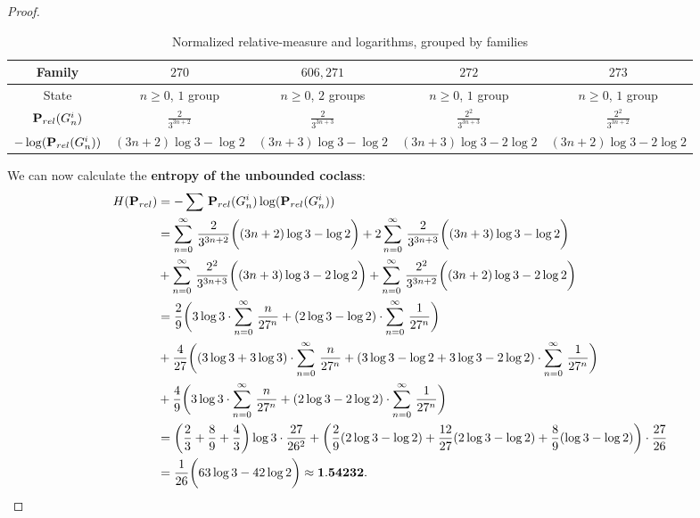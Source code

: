 \documentclass{amsart}
\theoremstyle{definition}
\theoremstyle{remark}
\begin{document}
\begin{proof}
\begin{table}[ht]
\caption{Normalized relative-measure and logarithms, grouped by families}
\label{tbl:RelativeMeasuresUnbounded}
\begin{center}
\begin{tabular}{|c||c|c|c|c|}
\hline
 Family                          & \(270\)                  &  \(606,271\)             &  \(272\)                 &  \(273\)                 \\
\hline
 State                           & \(n\ge 0\), \(1\) group  & \(n\ge 0\), \(2\) groups & \(n\ge 0\), \(1\) group  & \(n\ge 0\), \(1\) group  \\
 \({\bf P}_{rel}(G_n^i)\)        & \(\frac{2}{3^{3n+2}}\)   & \(\frac{2}{3^{3n+3}}\)   & \(\frac{2^2}{3^{3n+3}}\) & \(\frac{2^2}{3^{3n+2}}\) \\
 \(-\log({\bf P}_{rel}(G_n^i))\) & \((3n+2)\log3-\log2\)    & \((3n+3)\log3-\log2\)    & \((3n+3)\log3-2\log2\)   & \((3n+2)\log3-2\log2\)   \\
\hline
\end{tabular}
\end{center}
\end{table}

\noindent
We can now calculate the \textbf{entropy of the unbounded coclass}:
{\small
\begin{equation*}
\label{eqn:Entropy}
\begin{aligned}
H({\bf P}_{rel})
&=-\sum\,{\bf P}_{rel}(G_n^i)\log({\bf P}_{rel}(G_n^i)) \\
&=\sum_{n=0}^{\infty}\,\frac{2}{3^{3n+2}}\biggl((3n+2)\log3-\log2\biggr)
+2\sum_{n=0}^{\infty}\,\frac{2}{3^{3n+3}}\biggl((3n+3)\log3-\log2\biggr) \\
&+\sum_{n=0}^{\infty}\,\frac{2^2}{3^{3n+3}}\biggl((3n+3)\log3-2\log2\biggr)
+\sum_{n=0}^{\infty}\,\frac{2^2}{3^{3n+2}}\biggl((3n+2)\log3-2\log2\biggr) \\
&=\frac{2}{9}\biggl(3\log3\cdot\sum_{n=0}^{\infty}\,\frac{n}{27^n}+(2\log3-\log2)\cdot\sum_{n=0}^{\infty}\,\frac{1}{27^n}\biggr) \\
&+\frac{4}{27}\biggl((3\log3+3\log3)\cdot\sum_{n=0}^{\infty}\,\frac{n}{27^n}+(3\log3-\log2+3\log3-2\log2)\cdot\sum_{n=0}^{\infty}\,\frac{1}{27^n}\biggr) \\
&+\frac{4}{9}\biggl(3\log3\cdot\sum_{n=0}^{\infty}\,\frac{n}{27^n}+(2\log3-2\log2)\cdot\sum_{n=0}^{\infty}\,\frac{1}{27^n}\biggr) \\
&=\biggl(\frac{2}{3}+\frac{8}{9}+\frac{4}{3}\biggr)\log3\cdot\frac{27}{26^2}
+\biggl(\frac{2}{9}(2\log3-\log2)+\frac{12}{27}(2\log3-\log2)+\frac{8}{9}(\log3-\log2)\biggr)\cdot\frac{27}{26} \\
&=\frac{1}{26}\biggl(63\log3-42\log2\biggr)
\approx{\bf 1.54232}. \qedhere 
\end{aligned}
\end{equation*}
}
\end{proof}
\end{document}
